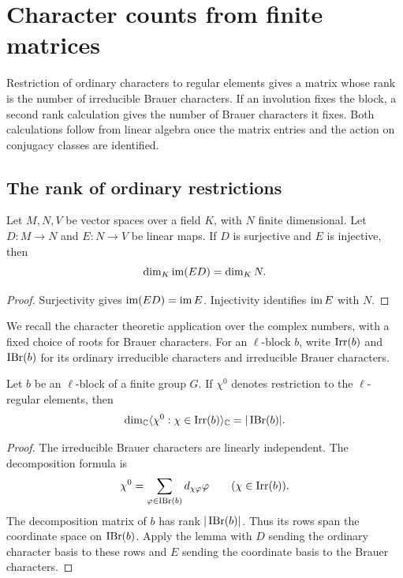 \chapter{Character counts from finite matrices}
\label{chap:library-computations}

Restriction of ordinary characters to regular elements gives a
matrix whose rank is the number of irreducible Brauer characters.
If an involution fixes the block, a second rank calculation gives
the number of Brauer characters it fixes. Both calculations follow
from linear algebra once the matrix entries and the action on
conjugacy classes are identified.

\section{The rank of ordinary restrictions}

\begin{lemma}
Let $M,N,V$ be vector spaces over a field $K$, with $N$ finite
dimensional. Let $D:M\to N$ and $E:N\to V$ be linear maps.
If $D$ is surjective and $E$ is injective, then
\[
 \dim_K\operatorname{im}(ED)=\dim_K N.
\]
\end{lemma}
\begin{proof}
Surjectivity gives $\operatorname{im}(ED)=\operatorname{im} E$. Injectivity identifies $\operatorname{im} E$
with $N$.
\end{proof}

We recall the character theoretic application over the complex
numbers, with a fixed choice of roots for Brauer characters.
For an $\ell$-block $b$, write $\operatorname{Irr}(b)$ and $\operatorname{IBr}(b)$ for its ordinary
irreducible characters and irreducible Brauer characters.

\begin{theorem}
Let $b$ be an $\ell$-block of a finite group $G$. If $\chi^0$ denotes
restriction to the $\ell$-regular elements, then
\begin{equation}
 \dim_{\mathbb C}\langle\chi^0:\chi\in\operatorname{Irr}(b)\rangle_{\mathbb C}
   =|\operatorname{IBr}(b)|.
 \label{lib:computations:restriction-rank}
\end{equation}
\end{theorem}
\begin{proof}
The irreducible Brauer characters are linearly independent.
The decomposition formula is
\[
 \chi^0=\sum_{\varphi\in\operatorname{IBr}(b)}d_{\chi\varphi}\varphi
 \qquad(\chi\in\operatorname{Irr}(b)).
\]
The decomposition matrix of $b$ has rank $|\operatorname{IBr}(b)|$.
Thus its rows span the coordinate space on $\operatorname{IBr}(b)$.
Apply the lemma with $D$ sending the ordinary character basis to
these rows and $E$ sending the coordinate basis to the Brauer
characters.
\end{proof}

